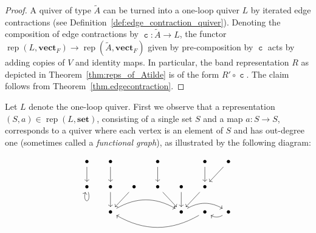 \documentclass[a4paper]{amsart}
\theoremstyle{plain}
\theoremstyle{definition}
\theoremstyle{remark}
\newcommand{\funct}[1]{\operatorname{\mathtt{#1}}}
\newcommand{\Set}{\mathbf{Set}}
\newcommand{\set}{\mathbf{set}}
\newcommand{\vectF}{\mathbf{vect}_F}
\DeclareMathOperator{\rep}{rep}
\begin{document}
\begin{proof}
A quiver of type \( \widetilde{A} \) can be turned into a one-loop quiver $L$ by iterated edge contractions (see Definition~\ref{def:edge_contraction_quiver}). Denoting the composition of edge contractions by $\funct{c}\colon \widetilde{A}\to L$, the functor $\rep(L, \vectF) \to \rep (\widetilde{A},\vectF)$ given by pre-composition by $\funct{c}$ acts by adding copies of $V$ and identity maps. In particular, the band representation $R$ as depicted in Theorem~\ref{thm:reps_of_Atilde} is of the form $R'\circ \funct{c}$. The claim follows from Theorem~\ref{thm.edgecontraction}.
\end{proof}

%

Let $L$ denote the one-loop quiver. First we observe that a representation $(S,a)\in \rep(L,\set)$, consisting of a single set $S$ and a map $a \colon S \to S$, corresponds to a quiver where each vertex is an element of $S$ and has out-degree one (sometimes called a \emph{functional graph}), as illustrated by the following diagram:

\[\begin{tikzcd}[column sep=5mm]
\bullet\ar[d] & \bullet\ar[d] &  & \bullet\ar[d]&  & \bullet\ar[d]& \bullet\ar[dl]\\
\bullet\ar[loop below] & \bullet\ar[d] & \bullet\ar[dl] & \bullet\ar[dr] & \bullet\ar[d] & \bullet \ar[dl]&\\
 & \bullet\ar[rrr, bend left] &  &  & \bullet\ar[rr, bend left] & \bullet\ar[llll, bend left] & \bullet \ar[l, bend left]
\end{tikzcd}
\]
\end{document}
